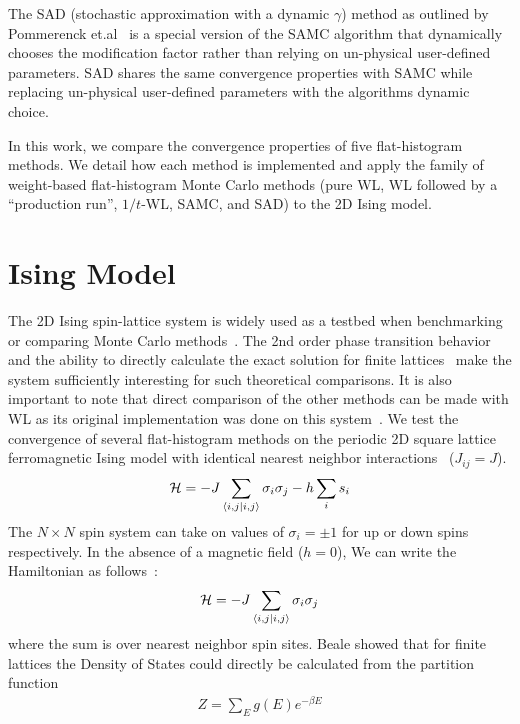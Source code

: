 The SAD (stochastic approximation with a
dynamic $\gamma$) method as outlined by Pommerenck
et.al~\cite{pommerenck2020stochastic} is a special version of the SAMC algorithm
that dynamically chooses the modification factor rather than relying on
un-physical user-defined parameters. SAD shares the same convergence properties
with SAMC while replacing un-physical user-defined parameters with the
algorithms dynamic choice.

In this work, we compare the convergence properties of five flat-histogram
methods. We detail how each method is implemented and apply the family of
weight-based flat-histogram Monte Carlo methods (pure WL, WL followed by a
``production run'', $1/t$-WL, SAMC, and SAD) to the 2D Ising model.

\section{Ising Model}
The 2D Ising spin-lattice system is widely used as a testbed when
benchmarking or comparing Monte Carlo
methods~\cite{ferdinand1969bounded, wang1999transition, trebst2004optimizing, barash2019estimating}. The 2nd order
phase transition behavior and the ability to directly calculate the
exact solution for finite lattices~\cite{beale1996exact, haggkvist2004computation} make the
system sufficiently interesting for such theoretical comparisons. It is
also important to note that direct comparison of the other methods can
be made with WL as its original implementation was done on this
system~\cite{wang2001determining,wang2001efficient}.
We test the convergence of several flat-histogram methods
on the periodic 2D square lattice ferromagnetic Ising model with identical
nearest neighbor interactions~\cite{landau2004new} ($J_{ij} = J$).
\begin{align}
\mathcal{H} = -J \sum_{\braket{i,j}} \sigma_i \sigma_j - h \sum_i s_i
\end{align}
The $N\times N$ spin system can take on values of $\sigma_i = \pm 1$
for up or down spins respectively. In the absence of a magnetic field ($h =
0$), We can write the Hamiltonian as follows~\cite{onsager1944crystal,
kaufman1949crystal}:
\begin{align}
\mathcal{H} = - J\sum_{\braket{i,j}} \sigma_i \sigma_j
\end{align}
where the sum is over nearest neighbor spin sites. Beale showed that for finite
lattices the Density of States could directly be calculated from the partition
function~\cite{beale1996exact}
\begin{align}
Z = \sum_E g(E) e^{-{\beta E}}
\end{align}
